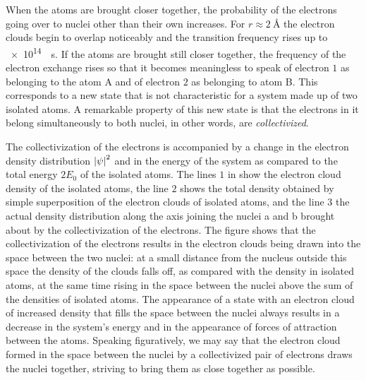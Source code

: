 When the atoms are brought closer together, the probability of the electrons going over to nuclei other than their own increases. For $r\approx\SI{2}{\angstrom}$ the electron clouds begin to overlap noticeably and the transition frequency rises up to \SI{e14}{\per\second}. If the atoms are brought still closer together, the frequency of the electron exchange rises so that it becomes meaningless to speak of electron $1$ as belonging to the atom A and of electron $2$ as belonging to atom B. This corresponds to a new state that is not characteristic for a system made up of two isolated atoms. A remarkable property of this new state is that the electrons in it belong simultaneously to both nuclei, in other words, are \textit{collectivized}.

The collectivization of the electrons is accompanied by a change in the electron density distribution $\left| \psi \right|^2$ and in the energy of the system as compared to the total energy $2E_0$ of the isolated atoms. The lines $1$ in  show the electron cloud density of the isolated atoms, the line $2$ shows the total density obtained by simple superposition of the electron clouds of isolated atoms, and the line $3$ the actual density distribution along the axis joining the nuclei a and b brought about by the collectivization of the electrons. The figure shows that the collectivization of the electrons results in the electron clouds being drawn into the space between the two nuclei: at a small distance from the nucleus outside this space the density of the clouds falls off, as compared with the density in isolated atoms, at the same time rising in the space between the nuclei above the sum of the densities of isolated atoms. The appearance of a state with an electron cloud of increased density that fills the space between the nuclei always results in a decrease in the system's energy and in the appearance of forces of attraction between the atoms. Speaking figuratively, we may say that the electron cloud formed in the space between the nuclei by a collectivized pair of electrons draws the nuclei together, striving to bring them as close together as possible.


